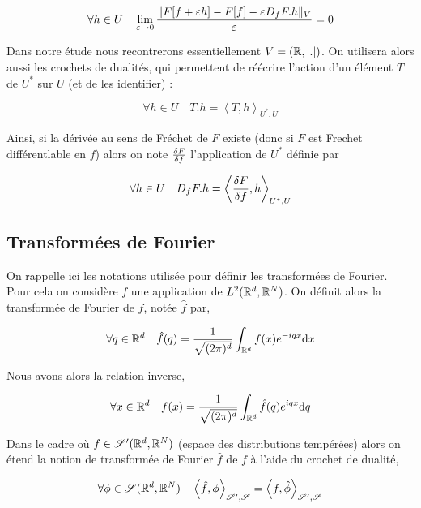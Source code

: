 \documentclass[10pt]{article}
\begin{document}
\begin{multicols}{2}
\begin{equation}
\forall h \in U \quad \lim_{ \varepsilon \rightarrow 0 } \frac{\| F[f+\varepsilon h] - F[f] - \varepsilon D_fF.h\|_V}{\varepsilon}  = 0
\end{equation} 


Dans notre étude nous recontrerons essentiellement $V = (\mathbb{R}, |.|)$. On utilisera alors aussi les crochets de dualités, qui permettent de réécrire l'action d'un élément $T$ de $U^*$ sur $U$ (et de les identifier) : 

\begin{equation}
  \forall h \in U \quad T.h = \left< T, h \right>_{U^*, U}
\end{equation}

Ainsi, si la dérivée au sens de Fréchet de $F$ existe (donc si $F$ est Frechet différentlable en $f$) alors on note $\frac{\delta F}{\delta f}$ l'application de $U^*$ définie par 

\begin{equation}
  \forall h \in U \quad D_fF.h = \left< \frac{\delta F}{\delta f}, h \right>_{U^*, U}
\end{equation}

\vspace*{11pt}



\subsection{Transformées de Fourier}

On rappelle ici les notations utilisée pour définir les transformées de Fourier. Pour cela on considère $f$ une application de $L^2(\mathbb{R}^d, \mathbb{R}^N)$. On définit alors la transformée de Fourier de $f$, notée $\hat{f}$ par, 

\begin{equation}
  \forall q \in \mathbb{R}^d \quad \hat{f}(q) = \frac{1}{\sqrt{(2\pi)^d}}\int_{\mathbb{R}^d} f(x) e^{-iqx}\text{d} x
\end{equation}

Nous avons alors la relation inverse,

\begin{equation}
  \forall x \in \mathbb{R}^d \quad f(x) = \frac{1}{\sqrt{(2\pi)^d}}\int_{\mathbb{R}^d} \hat{f}(q) e^{iqx}\text{d} q
\end{equation}

Dans le cadre où $f \in \mathscr{S}'(\mathbb{R}^d, \mathbb{R}^N)$ (espace des distributions tempérées) alors on étend la notion de transformée de Fourier $\hat{f}$ de $f$ à l'aide du crochet de dualité, 

\begin{equation}
  \forall \phi \in \mathscr{S}(\mathbb{R}^d, \mathbb{R}^N) \quad \left< \hat{f}, \phi \right>_{\mathscr{S}', \mathscr{S}} = \left< f, \hat{\phi} \right>_{\mathscr{S}', \mathscr{S}}
\end{equation}


\end{multicols}
\end{document}
